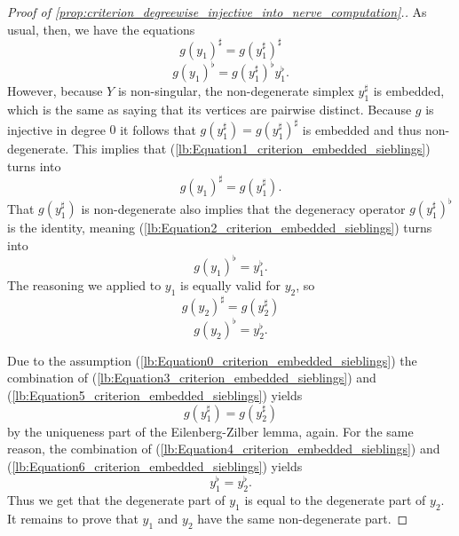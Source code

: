 \begin{proof}[Proof of \cref{prop:criterion_degreewise_injective_into_nerve_computation}.]
As usual, then, we have the equations
\begin{equation}\label{lb:Equation1_criterion_embedded_sieblings}
g(y_1)^\sharp =g(y_1^\sharp )^\sharp
\end{equation}
\begin{equation}\label{lb:Equation2_criterion_embedded_sieblings}
g(y_1)^\flat =g(y_1^\sharp )^\flat y_1^\flat .
\end{equation}
However, because $Y$ is non-singular, the non-degenerate simplex $y_1^\sharp$ is embedded, which is the same as saying that its vertices are pairwise distinct. Because $g$ is injective in degree $0$ it follows that $g(y_1^\sharp )=g(y_1^\sharp )^\sharp$ is embedded and thus non-degenerate. This implies that (\ref{lb:Equation1_criterion_embedded_sieblings}) turns into
\begin{equation}\label{lb:Equation3_criterion_embedded_sieblings}
g(y_1)^\sharp =g(y_1^\sharp ).
\end{equation}
That $g(y_1^\sharp )$ is non-degenerate also implies that the degeneracy operator $g(y_1^\sharp )^\flat$ is the identity, meaning (\ref{lb:Equation2_criterion_embedded_sieblings}) turns into
\begin{equation}\label{lb:Equation4_criterion_embedded_sieblings}
g(y_1)^\flat =y_1^\flat .
\end{equation}
The reasoning we applied to $y_1$ is equally valid for $y_2$, so
\begin{equation}\label{lb:Equation5_criterion_embedded_sieblings}
g(y_2)^\sharp =g(y_2^\sharp )
\end{equation}
\begin{equation}\label{lb:Equation6_criterion_embedded_sieblings}
g(y_2)^\flat =y_2^\flat .
\end{equation}

Due to the assumption (\ref{lb:Equation0_criterion_embedded_sieblings}) the combination of (\ref{lb:Equation3_criterion_embedded_sieblings}) and (\ref{lb:Equation5_criterion_embedded_sieblings}) yields
\begin{equation}\label{lb:Equation7_criterion_embedded_sieblings}
g(y_1^\sharp )=g(y_2^\sharp )
\end{equation}
by the uniqueness part of the Eilenberg-Zilber lemma, again. For the same reason, the combination of (\ref{lb:Equation4_criterion_embedded_sieblings}) and (\ref{lb:Equation6_criterion_embedded_sieblings}) yields
\begin{equation}\label{lb:Equation8_criterion_embedded_sieblings}
y_1^\flat =y_2^\flat .
\end{equation}
Thus we get that the degenerate part of $y_1$ is equal to the degenerate part of $y_2$. It remains to prove that $y_1$ and $y_2$ have the same non-degenerate part.


\end{proof}
